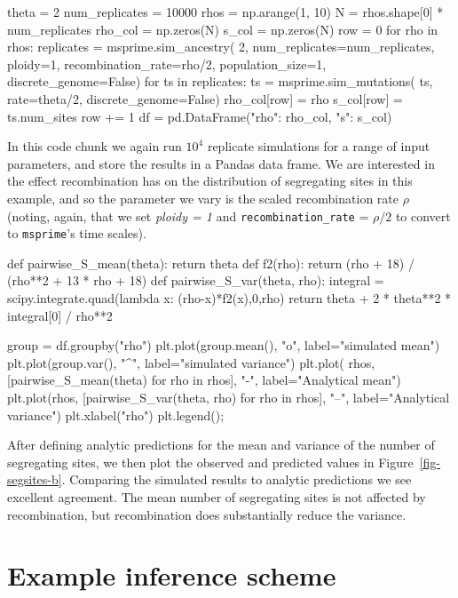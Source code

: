 \documentclass[graybox]{svmult}
\newcommand{\msprime}[0]{\texttt{msprime}}
\begin{document}
\begin{pythoncode}
theta = 2
num_replicates = 10000
rhos = np.arange(1, 10)
N = rhos.shape[0] * num_replicates
rho_col = np.zeros(N)
s_col = np.zeros(N)
row = 0
for rho in rhos:
    replicates = msprime.sim_ancestry(
        2, num_replicates=num_replicates, ploidy=1,
        recombination_rate=rho/2, population_size=1,
        discrete_genome=False)
    for ts in replicates:
        ts = msprime.sim_mutations(
            ts, rate=theta/2, discrete_genome=False)
        rho_col[row] = rho
        s_col[row] = ts.num_sites
        row += 1
df = pd.DataFrame({"rho": rho_col, "s": s_col})
\end{pythoncode}

In this code chunk we again run $10^4$ replicate simulations for a range
of input parameters, and store the results in a Pandas data frame. We
are interested in the effect recombination has on the distribution of segregating sites in this example,
and so the parameter we vary is the scaled recombination rate
$\rho$ (noting, again, that we set \emph{ploidy = 1} and
\texttt{recombination\_rate} = $\rho / 2$ to convert to \msprime's
time scales).

\begin{pythoncode}
def pairwise_S_mean(theta):
    return theta
def f2(rho):
    return (rho + 18) / (rho**2 + 13 * rho + 18)
def pairwise_S_var(theta, rho):
    integral = scipy.integrate.quad(lambda x: (rho-x)*f2(x),0,rho)
    return theta + 2 * theta**2 * integral[0] / rho**2

group = df.groupby("rho")
plt.plot(group.mean(), "o", label="simulated mean")
plt.plot(group.var(), "^", label="simulated variance")
plt.plot(
    rhos, [pairwise_S_mean(theta) for rho in rhos], "-",
    label="Analytical mean")
plt.plot(rhos, [pairwise_S_var(theta, rho) for rho in rhos], "--",
label="Analytical variance")
plt.xlabel("rho")
plt.legend();
\end{pythoncode}

After defining analytic predictions for the mean and variance of the
number of segregating sites, we then plot the observed and predicted values
in Figure~\ref{fig-segsites-b}.
Comparing the simulated results to analytic predictions we see
excellent agreement. The mean number of segregating sites is not
affected by recombination, but recombination does substantially reduce
the variance.

\section{Example inference scheme}\label{sec:inference}
\end{document}
